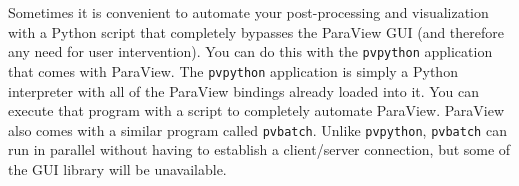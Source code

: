 Sometimes it is convenient to automate your post-processing and
visualization with a Python script that completely bypasses the ParaView
GUI (and therefore any need for user intervention).  You can do this with
the \texttt{pvpython} application that comes with ParaView.  The
\texttt{pvpython} application is simply a Python interpreter with all of
the ParaView bindings already loaded into it.  You can execute that program
with a script to completely automate ParaView.  ParaView also comes with a
similar program called \texttt{pvbatch}.  Unlike \texttt{pvpython},
\texttt{pvbatch} can run in parallel without having to establish a
client/server connection, but some of the GUI library will be unavailable.


